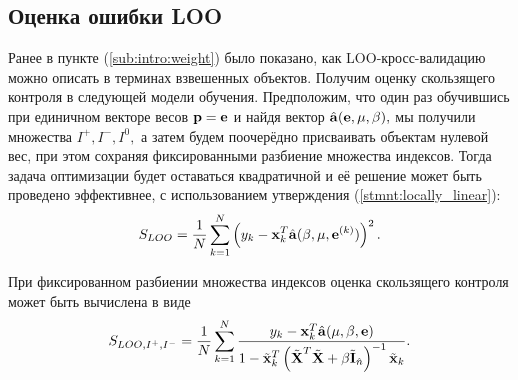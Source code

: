 \subsection{Оценка ошибки LOO}
Ранее в пункте (\ref{sub:intro:weight}) было показано, как LOO-кросс-валидацию можно описать в терминах взвешенных объектов.
Получим оценку скользящего контроля в следующей модели обучения. Предположим, что один раз обучившись при единичном векторе весов $\boldsymbol{\mathbf{p}} = \boldsymbol{\mathbf{e}}$ и найдя вектор $\hat{\boldsymbol{\mathbf{a}}}(\boldsymbol{\mathbf{e}}, {\mu,\beta}),$ мы получили множества $I^+, I^-, I^0,$ а затем будем поочерёдно присваивать объектам нулевой вес, при этом сохраняя фиксированными разбиение множества индексов. Тогда задача оптимизации будет оставаться квадратичной и её решение может быть проведено эффективнее, с использованием утверждения (\ref{stmnt:locally_linear}):
\begin{equation}
	\label{LOO}
	S_{LOO} = \frac1N\sum\limits_{k=1}^N \left(y_k - \boldsymbol{\mathbf{x}}_k^T\hat{\boldsymbol{\mathbf{a}}}(\beta, \mu, \boldsymbol{\mathbf{e}}^{(k)})\right)^2.
\end{equation}




\begin{statement}
\label{stmnt:CVI}
При фиксированном разбиении множества индексов оценка скользящего контроля может быть вычислена в виде
\begin{equation*}
	S_{LOO, I^+, I^-} = \frac1N\sum\limits_{k=1}^N\frac{y_k - \boldsymbol{\mathbf{x}}_k^T\hat{\boldsymbol{\mathbf{a}}}({\mu,\beta}, \boldsymbol{\mathbf{e}})}{1 - \tilde{\boldsymbol{\mathbf{x}}}_k^T\left(\tilde{\boldsymbol{\mathbf{X}}}^T\tilde{\boldsymbol{\mathbf{X}}} + \beta \tilde{\boldsymbol{\mathbf{I}}}_{\hat n}\right)^{-1}\tilde{\boldsymbol{\mathbf{x}}}_k}.
\end{equation*}
\end{statement}

